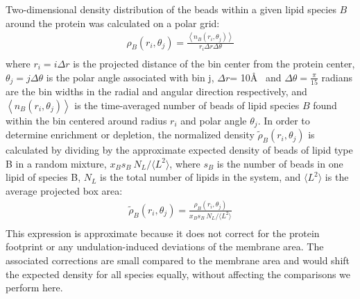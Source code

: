   Two-dimensional density distribution of the beads within a given lipid species $B$ around the protein was calculated on a polar grid: 
  \begin{equation}
    \begin{aligned}
      \rho_{B}(r_i,\theta_j)= \frac{\left\langle n_{B}(r_i,\theta_j) \right\rangle}{r_i \Delta{r}\Delta{\theta}} \\        
    \end{aligned}
    \label{eq:R}
  \end{equation}
  where  $r_i = i \Delta{r}$ is the projected distance of the bin center from the protein center, $\theta_j = j \Delta{\theta}$ is the polar angle associated with bin j,  $\Delta{r}$= 10\AA~ and  $\Delta{\theta} = \frac{\pi}{15}$ radians are the bin widths in the radial and angular direction respectively, and $\left\langle n_{B}(r_i,\theta_j) \right\rangle$ is the time-averaged number of beads of lipid species $B$ found within the bin centered around radius $r_{i}$ and polar angle $\theta_{j}$.  In order to determine enrichment or depletion, the normalized density $ \tilde{\rho}_{B}(r_i,\theta_j)$ is calculated by dividing by the approximate expected density of beads of lipid type B in a random mixture, $x_{B}s_{B}~N_{L}/\langle L^{2}\rangle$, where $s_{B}$ is the number of beads in one lipid of species B, $N_{L}$ is the total number of lipids in the system, and $\langle L^{2}\rangle$ is the average projected box area: 
  \begin{equation}
    \begin{aligned}
  \tilde{\rho}_{B}(r_i,\theta_j)=\frac{ \rho_{B}(r_i,\theta_j)}{x_{B}s_{B}~N_{L}/\langle L^{2}\rangle} \\        
    \end{aligned}
    \label{eq:Rt}
  \end{equation}
  This expression is approximate because it does not correct for the protein footprint or any undulation-induced deviations of the membrane area.  The associated corrections are small compared to the membrane area and would shift the expected density for all species equally, without affecting the comparisons we perform here.   

 

